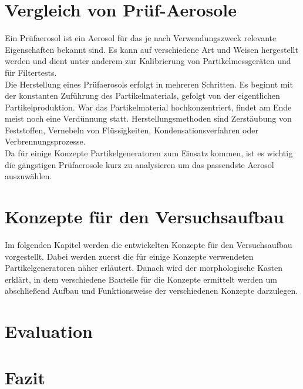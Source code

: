 \chapter{Vergleich von Pr\"{u}f-Aerosole}\label{ch:aerosol}
Ein Pr\"{u}faerosol ist ein Aerosol f\"{u}r das je nach Verwendungszweck relevante Eigenschaften bekannt sind. Es kann auf verschiedene Art und Weisen hergestellt werden und dient unter anderem zur Kalibrierung von Partikelmessger\"{a}ten und f\"{u}r Filtertests.\\
Die Herstellung eines Pr\"{u}faerosols erfolgt in mehreren Schritten. Es beginnt mit der konstanten Zuf\"{u}hrung des Partikelmaterials, gefolgt von der eigentlichen Partikelproduktion. War das Partikelmaterial hochkonzentriert, findet am Ende meist noch eine Verd\"{u}nnung statt. Herstellungsmethoden sind Zerst\"{a}ubung von Feststoffen, Vernebeln von Fl\"{u}ssigkeiten, Kondensationsverfahren oder Verbrennungsprozesse.\\
Da f\"{u}r einige Konzepte Partikelgeneratoren zum Einsatz kommen, ist es wichtig die g\"{a}ngstigen Pr\"{u}faerosole kurz zu analysieren um das passendste Aerosol auszuw\"{a}hlen.








\chapter{Konzepte f\"{u}r den Versuchsaufbau}\label{ch:concepts}
Im folgenden Kapitel werden die entwickelten Konzepte für den Versuchsaufbau vorgestellt. Dabei werden zuerst die f\"{u}r einige Konzepte verwendeten Partikelgeneratoren n\"{a}her erl\"{a}utert. Danach wird der morphologische Kasten erkl\"{a}rt, in dem verschiedene Bauteile f\"{u}r die Konzepte ermittelt werden um abschlie{\ss}end Aufbau und Funktionsweise der verschiedenen Konzepte darzulegen.








\chapter{Evaluation}\label{ch:evaluation}




\chapter{Fazit}\label{ch:conclusion}



